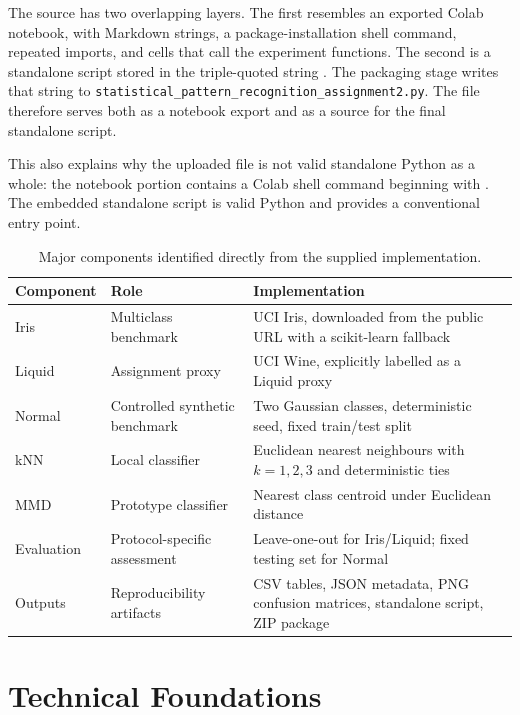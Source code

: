 \documentclass[11pt,a4paper]{article}
\newcommand{\code}[1]{\texttt{\detokenize{#1}}}
\begin{document}
The source has two overlapping layers. The first resembles an exported Colab notebook, with Markdown strings, a package-installation shell command, repeated imports, and cells that call the experiment functions. The second is a standalone script stored in the triple-quoted string \code{script_text}. The packaging stage writes that string to \nolinkurl{statistical_pattern_recognition_assignment2.py}. The file therefore serves both as a notebook export and as a source for the final standalone script.

This also explains why the uploaded file is not valid standalone Python as a whole: the notebook portion contains a Colab shell command beginning with \code{!pip}. The embedded standalone script is valid Python and provides a conventional \code{main()} entry point.

\begin{table}[ht]
\centering
\small
\begin{tabular}{>{\raggedright\arraybackslash}p{}>{\raggedright\arraybackslash}p{}>{\raggedright\arraybackslash}p{}}
\toprule
\textbf{Component} & \textbf{Role} & \textbf{Implementation} \\
\midrule
Iris & Multiclass benchmark & UCI Iris, downloaded from the public URL with a scikit-learn fallback \\
Liquid & Assignment proxy & UCI Wine, explicitly labelled as a Liquid proxy \\
Normal & Controlled synthetic benchmark & Two Gaussian classes, deterministic seed, fixed train/test split \\
kNN & Local classifier & Euclidean nearest neighbours with $k=1,2,3$ and deterministic ties \\
MMD & Prototype classifier & Nearest class centroid under Euclidean distance \\
Evaluation & Protocol-specific assessment & Leave-one-out for Iris/Liquid; fixed testing set for Normal \\
Outputs & Reproducibility artifacts & CSV tables, JSON metadata, PNG confusion matrices, standalone script, ZIP package \\
\bottomrule
\end{tabular}
\caption{Major components identified directly from the supplied implementation.}
\end{table}

\section{Technical Foundations}
\end{document}

